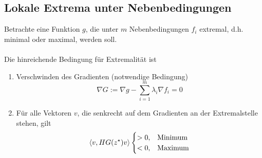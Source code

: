 \documentclass{article}
\begin{document}
\newpage


\subsection{Lokale Extrema unter Nebenbedingungen}
Betrachte eine Funktion $g$, die unter $m$ Nebenbedingungen $f_i$ extremal, d.h. minimal oder maximal, werden soll.\\
\\
Die hinreichende Bedingung für Extremalität ist
	\begin{enumerate}
		\item Verschwinden des Gradienten (notwendige Bedingung)
			\begin{equation}
				\nabla G := \nabla g - \sum_{i=1}^m \lambda_i \nabla f_i = 0
			\end{equation}
		
		\item Für alle Vektoren $v$, die senkrecht auf dem Gradienten an der Extremalstelle stehen, gilt
			\begin{equation}
				\braket{v,HG(z^\star) v}
				\begin{cases}
					> 0, & \text{Minimum}\\
					< 0, & \text{Maximum}
				\end{cases}
			\end{equation}
	\end{enumerate}
\end{document}
